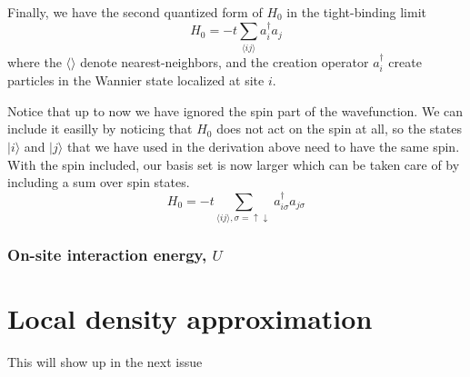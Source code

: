 \documentclass[11pt,letter]{article}
\newcommand{\dbl}{\ensuremath{ \uparrow\! \downarrow \, }}
\begin{document}
Finally, we have the second quantized form of $H_{0}$ in the tight-binding limit
\begin{equation}
  H_{0} = -t \sum_{ \langle ij \rangle } a_{i}^{\dagger}a_{j} 
\end{equation}
where the $\langle \rangle$ denote nearest-neighbors, and the creation operator $a_{i}^{\dagger}$ create particles in the Wannier state localized at site $i$.

Notice that up to now we have ignored the spin part of the wavefunction.   We
can include it easilly by noticing that $H_{0}$ does not act on the spin at
all, so the states $|i\rangle$ and $|j\rangle$ that we have used in the
derivation above need to have the same spin.   With the spin included, our basis set
is now larger which can be taken care of by including a sum over spin states.   
\begin{equation}
  H_{0} = -t \sum_{ \langle ij \rangle, \sigma=\dbl   } a_{i\sigma}^{\dagger}a_{j\sigma} 
\end{equation}

\subsubsection{On-site interaction energy, $U$}
 



\section{Local density approximation }

This will show up in the next issue



 



\end{document}
